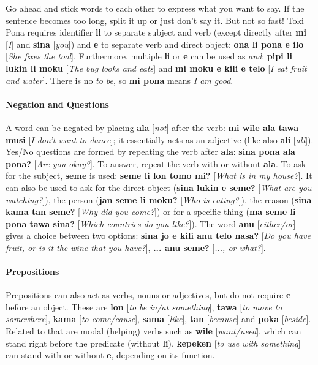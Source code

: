 \documentclass[10pt,a4paper]{article}
\begin{document}
\begin{multicols}{2}
Go ahead and stick words to each other to express what you want to say. If the sentence becomes too long, split it up or just don't say it. But not so fast! Toki Pona requires identifier \textbf{li} to separate subject and verb (except directly after \textbf{mi} [\textit{I}] and \textbf{sina} [\textit{you}]) and \textbf{e} to separate verb and direct object: \textbf{ona li pona e ilo} [\textit{She fixes the tool}]. Furthermore, multiple \textbf{li} or \textbf{e} can be used as \textit{and}: \textbf{pipi li lukin li moku} [\textit{The bug looks and eats}] and \textbf{mi moku e kili e telo} [\textit{I eat fruit and water}]. There is no \textit{to be}, so \textbf{mi pona} means \textit{I am good}.

\paragraph{Negation and Questions}

A word can be negated by placing \textbf{ala} [\textit{not}] after the verb: \textbf{mi wile ala tawa musi} [\textit{I don't want to dance}]; it essentially acts as an adjective (like also \textbf{ali} [\textit{all}]). Yes/No questions are formed by repeating the verb after \textbf{ala}: \textbf{sina pona ala pona?} [\textit{Are you okay?}]. To answer, repeat the verb with or without \textbf{ala}. To ask for the subject, \textbf{seme} is used: \textbf{seme li lon tomo mi?} [\textit{What is in my house?}]. It can also be used to ask for the direct object (\textbf{sina lukin e seme?} [\textit{What are you watching?}]), the person (\textbf{jan seme li moku?} [\textit{Who is eating?}]), the reason (\textbf{sina kama tan seme?} [\textit{Why did you come?}]) or for a specific thing (\textbf{ma seme li pona tawa sina?} [\textit{Which countries do you like?}]). The word \textbf{anu} [\textit{either/or}] gives a choice between two options: \textbf{sina jo e kili anu telo nasa?} [\textit{Do you have fruit, or is it the wine that you have?}], \textbf{... anu seme?} [\textit{..., or what?}].
\end{multicols}

\paragraph{Prepositions}

Prepositions can also act as verbs, nouns or adjectives, but do not require \textbf{e} before an object. These are \textbf{lon} [\textit{to be in/at something}], \textbf{tawa} [\textit{to move to somewhere}], \textbf{kama} [\textit{to come/cause}], \textbf{sama} [\textit{like}], \textbf{tan} [\textit{because}] and \textbf{poka} [\textit{beside}]. Related to that are modal (helping) verbs such as \textbf{wile} [\textit{want/need}], which can stand right before the predicate (without \textbf{li}). \textbf{kepeken} [\textit{to use with something}] can stand with or without \textbf{e}, depending on its function.
\end{document}
